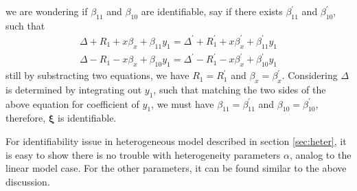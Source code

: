 \documentclass[12pt]{article}
\begin{document}
we are wondering if $\beta_{11}$ and $\beta_{10}$ are identifiable, say if 
there exists $\beta_{11}^{'}$ and $\beta_{10}^{'}$, such that
\begin{align*}
  \Delta + R_1 + x\beta_x + \beta_{11}y_1 = \Delta^{'} + R_1^{'} + x\beta_{x}^{'} + \beta_{11}^{'}y_1\\
  \Delta - R_1 - x\beta_x + \beta_{10}y_1 = \Delta^{'} - R_1^{'} -
  x\beta_{x}^{'} + \beta_{10}^{'}y_1
\end{align*}
still by substracting two equations, we have $R_1 = R_1^{'}$ and $\beta_x =
\beta_x^{'}$. Considering $\Delta$ is determined by integrating out $y_1$,
such that matching the two sides of the above equation for coefficient
of $y_1$, we must have $\beta_{11} = \beta_{11}^{'}$ and $\beta_{10} =
\beta_{10}^{'}$, therefore, $\bm \xi$ is identifiable.

For identifiability issue in heterogeneous model described in section \ref{sec:heter}, it is easy to show there is no trouble with heterogeneity parameters $\alpha$, analog to the linear model case. For the other parameters, it can be found similar to the above discussion.
\end{document}
